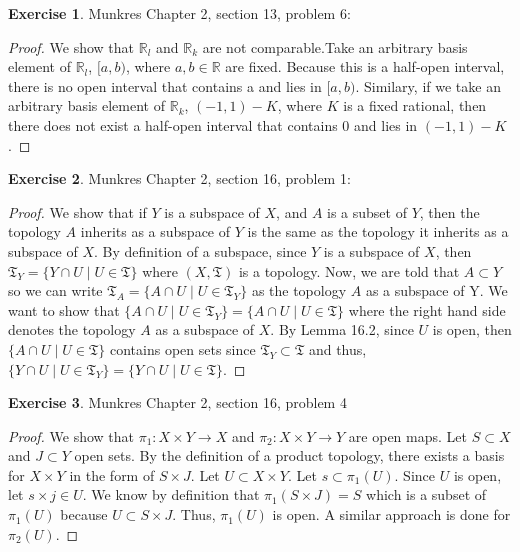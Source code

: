 \documentclass[12pt]{article}
\theoremstyle{definition}
\newtheorem{exercise}{Exercise}
\begin{document}
\begin{exercise} Munkres Chapter 2, section 13, problem 6:
\begin{proof}
	We show that $\mathbb{R}_l$ and $\mathbb{R}_k$ are not comparable.Take an arbitrary basis element of $\mathbb{R}_l$, $[a,b)$, where $a,b\in\mathbb{R}$ are fixed. Because this is a half-open interval, there is no open interval that contains a and lies in $[a,b)$. Similary, if we take an arbitrary basis element of $\mathbb{R}_k$, $(-1,1)-K$, where $K$ is a fixed rational, then there does not exist a half-open interval that contains 0 and lies in $(-1,1)-K$.
\end{proof}
\end{exercise} 

\begin{exercise} Munkres Chapter 2, section 16, problem 1:
\begin{proof}
	We show that if $Y$ is a subspace of $X$, and $A$ is a subset of $Y$, then the topology $A$ inherits as a subspace of $Y$ is the same as the topology it inherits as a subspace of $X$. By definition of a subspace, since $Y$ is a subspace of $X$, then $\mathfrak{T}_Y = \{Y\cap U\mid U\in \mathfrak{T}\}$ where $(X,\mathfrak{T})$ is a topology. Now, we are told that $A\subset Y$ so we can write $\mathfrak{T}_A = \{A\cap U\mid U\in \mathfrak{T}_Y\}$ as the topology $A$ as a subspace of Y. We want to show that $\{A\cap U\mid U\in \mathfrak{T}_Y\} = \{A\cap U\mid U\in \mathfrak{T}\}$ where the right hand side denotes the topology $A$ as a subspace of $X$. By Lemma 16.2, since $U$ is open, then $\{A\cap U\mid U\in \mathfrak{T}\}$ contains open sets since $\mathfrak{T}_Y\subset \mathfrak{T}$ and thus, $\{Y\cap U\mid U\in \mathfrak{T}_Y\}=\{Y\cap U\mid U\in \mathfrak{T}\}$.
\end{proof}
\end{exercise}

\begin{exercise} Munkres Chapter 2, section 16, problem 4
\begin{proof}
	We show that $\pi_1: X\times Y\to X$ and $\pi_2: X\times Y\to Y$ are open maps. Let $S\subset X$ and $J\subset Y$ open sets. By the definition of a product topology, there exists a basis for $X\times Y$ in the form of $S\times J$. Let $U\subset X\times Y$. Let $s\subset\pi_1(U)$. Since $U$ is open, let $s\times j\in U$. We know by definition that $\pi_1(S\times J)=S$ which is a subset of $\pi_1(U)$ because $U\subset S\times J$. Thus, $\pi_1(U)$ is open. A similar approach is done for $\pi_2(U)$.
	 
\end{proof}
\end{exercise}
\end{document}
